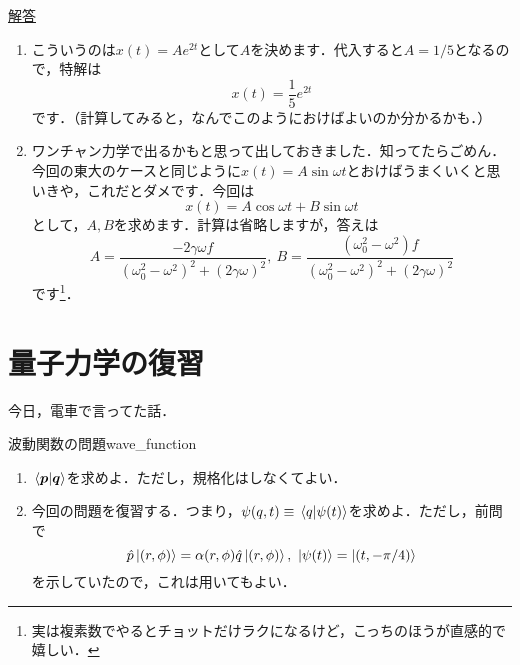 \documentclass[a4paper,pdflatex,ja=standard]{bxjsarticle}
\theoremstyle{definition}
\begin{document}
\uline{解答}
\begin{enumerate}
  \item 
  こういうのは$x(t)=Ae^{2t}$として$A$を決めます．代入すると$A=1/5$となるので，特解は
  \begin{equation}
    x(t)
    =
    \frac{1}{5}e^{2t}
  \end{equation}
  です．（計算してみると，なんでこのようにおけばよいのか分かるかも．）
  \item 
  ワンチャン力学で出るかもと思って出しておきました．知ってたらごめん．今回の東大のケースと同じように$x(t)=A\sin\omega t$とおけばうまくいくと思いきや，これだとダメです．今回は
  \begin{equation}
    x(t)
    =
    A\cos\omega t
    +
    B\sin\omega t
  \end{equation}
  として，$A,B$を求めます．計算は省略しますが，答えは
  \begin{equation}
    A
    =
    \frac{-2\gamma\omega f}{(\omega_0^2-\omega^2)^2+(2\gamma\omega)^2}
    ,\ 
    B
    =
    \frac{(\omega_0^2-\omega^2)f}{(\omega_0^2-\omega^2)^2+(2\gamma\omega)^2}
  \end{equation}
  です\footnote{
    実は複素数でやるとチョットだけラクになるけど，こっちのほうが直感的で嬉しい．
  }．
\end{enumerate}


\section{量子力学の復習}

今日，電車で言ってた話．
\begin{mondai}{波動関数の問題}{wave_function}
  \begin{enumerate}
    \item 
    $\ev*{\bm{p}|\bm{q}}$を求めよ．ただし，規格化はしなくてよい．
    \item 
    今回の問題を復習する．つまり，$\psi(q,t)\equiv\ev*{q|\psi(t)}$を求めよ．ただし，前問で
    \begin{equation}
      \hat{p}
      \ket{(r,\phi)}
      =
      \alpha(r,\phi)\hat{q}
      \ket{(r,\phi)}
      ,\ 
      \ket{\psi(t)}
      =
      \ket{(t,-\pi/4)}
    \end{equation}
    を示していたので，これは用いてもよい．
  \end{enumerate}
\end{mondai}
\end{document}
